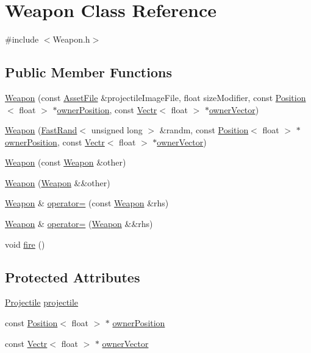 \hypertarget{class_weapon}{\section{Weapon Class Reference}
\label{class_weapon}
}


{\ttfamily \#include $<$Weapon.\-h$>$}

\subsection*{Public Member Functions}
\begin{DoxyCompactItemize}
\item 
\hyperlink{class_weapon_a36659b761fc09ceed63bb6643a168211}{Weapon} (const \hyperlink{struct_asset_file}{Asset\-File} \&projectile\-Image\-File, float size\-Modifier, const \hyperlink{struct_position}{Position}$<$ float $>$ $\ast$\hyperlink{class_weapon_a4f23fa5f82c185dbe975f6d005b0f90a}{owner\-Position}, const \hyperlink{struct_vectr}{Vectr}$<$ float $>$ $\ast$\hyperlink{class_weapon_a5aad357adfe3e9bdcebc95ee99202ab4}{owner\-Vector})
\item 
\hyperlink{class_weapon_aad2f19173e90be4a0097a67c66887794}{Weapon} (\hyperlink{class_fast_rand}{Fast\-Rand}$<$ unsigned long $>$ \&randm, const \hyperlink{struct_position}{Position}$<$ float $>$ $\ast$\hyperlink{class_weapon_a4f23fa5f82c185dbe975f6d005b0f90a}{owner\-Position}, const \hyperlink{struct_vectr}{Vectr}$<$ float $>$ $\ast$\hyperlink{class_weapon_a5aad357adfe3e9bdcebc95ee99202ab4}{owner\-Vector})
\item 
\hyperlink{class_weapon_ac0c75166822c7694cb0410b80a58d475}{Weapon} (const \hyperlink{class_weapon}{Weapon} \&other)
\item 
\hyperlink{class_weapon_abbada20225959c54f036cbab506f3d94}{Weapon} (\hyperlink{class_weapon}{Weapon} \&\&other)
\item 
\hyperlink{class_weapon}{Weapon} \& \hyperlink{class_weapon_a5995665bd4c14aa5b2a8773b5c631019}{operator=} (const \hyperlink{class_weapon}{Weapon} \&rhs)
\item 
\hyperlink{class_weapon}{Weapon} \& \hyperlink{class_weapon_a473db96007a6599273c42c182f2b16d7}{operator=} (\hyperlink{class_weapon}{Weapon} \&\&rhs)
\item 
void \hyperlink{class_weapon_af6f8ab97e28fd4778f97c96c78fd02f4}{fire} ()
\end{DoxyCompactItemize}
\subsection*{Protected Attributes}
\begin{DoxyCompactItemize}
\item 
\hyperlink{class_projectile}{Projectile} \hyperlink{class_weapon_ab4dcfce3b3a14222f847e50e95451164}{projectile}
\item 
const \hyperlink{struct_position}{Position}$<$ float $>$ $\ast$ \hyperlink{class_weapon_a4f23fa5f82c185dbe975f6d005b0f90a}{owner\-Position}
\item 
const \hyperlink{struct_vectr}{Vectr}$<$ float $>$ $\ast$ \hyperlink{class_weapon_a5aad357adfe3e9bdcebc95ee99202ab4}{owner\-Vector}
\end{DoxyCompactItemize}


